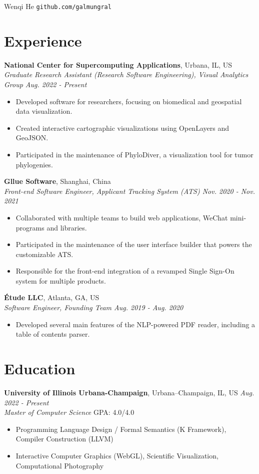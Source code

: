 \documentclass[12pt]{article}
\begin{document}
{\Huge Wenqi He} \quad \texttt{github.com/galmungral}

\section*{Experience}

\textbf{National Center for Supercomputing Applications}, Urbana, IL, US\\
\textit{Graduate Research Assistant (Research Software Engineering), Visual Analytics Group \hfill Aug. 2022 - Present}
\begin{itemize}
\item Developed software for researchers, focusing on biomedical and geospatial data visualization.
\item Created interactive cartographic visualizations using OpenLayers and GeoJSON.
\item Participated in the maintenance of PhyloDiver, a visualization tool for tumor phylogenies.
\end{itemize}

\textbf{Gllue Software}, Shanghai, China\\
\textit{Front-end Software Engineer, Applicant Tracking System (ATS) \hfill Nov. 2020 - Nov. 2021}
\begin{itemize}
\item Collaborated with multiple teams to build web applications, WeChat mini-programs and libraries.
\item Participated in the maintenance of the user interface builder that powers the customizable ATS.
\item Responsible for the front-end integration of a revamped Single Sign-On system for multiple products.
\end{itemize}

\textbf{Étude LLC}, Atlanta, GA, US\\
\textit{Software Engineer, Founding Team \hfill Aug. 2019 - Aug. 2020}
\begin{itemize}
\item Developed several main features of the NLP-powered PDF reader, including a table of contents parser.
\end{itemize}

\section*{Education}
\textbf{University of Illinois Urbana-Champaign}, Urbana–Champaign, IL, US \hfill \textit{Aug. 2022 - Present} \\
\textit{Master of Computer Science}  \hfill GPA: 4.0/4.0 
\begin{itemize}
\small
\item Programming Language Design / Formal Semantics (K Framework), Compiler Construction (LLVM)
\item Interactive Computer Graphics (WebGL), Scientific Visualization, Computational Photography
\end{itemize}
\end{document}
